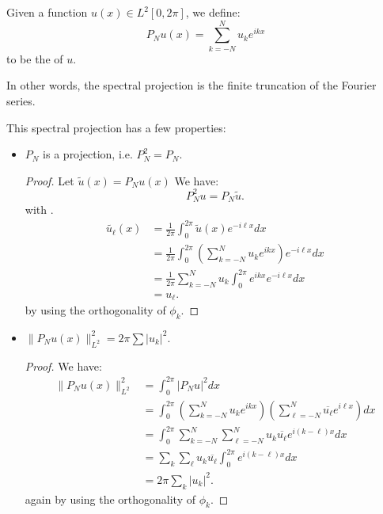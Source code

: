 \documentclass[../main/main.tex]{subfiles}
\begin{document}
    \begin{definition}
        Given a function $u(x) \in  L^2[0,2\pi]$, we define: \[
            P_Nu(x) = \sum_{k=-N}^N u_k e^{ikx}
        \] to be the  of $u$.  
    \end{definition}
    \begin{remark}
        In other words, the spectral projection is the finite truncation of the Fourier series.
    \end{remark}
    This spectral projection has a few properties:
    \begin{itemize}
        \item $P_N$ is a projection, i.e.  $P_N^2 = P_N$.
            \begin{proof}
                Let $\tilde{u}(x) = P_Nu(x)$
                We have: \[
                P_N^2 u = P_N \tilde{u}
                .\] with 
                .
                \begin{align*}
                    \tilde{u_\ell}(x) &= \frac{1}{2\pi} \int ^{2\pi}_0 \tilde{u}(x) e^{-i\ell x}dx \\
                                      &= \frac{1}{2\pi} \int ^{2\pi}_0 \left( \sum_{k = -N}^{N}u_k e^{ikx} \right)  e^{-i\ell x}dx \\
                                      &= \frac{1}{2\pi}\sum_{k=-N}^Nu_k \int ^{2\pi}_0 e^{ikx}  e^{-i\ell x}dx \\
                                      &= u_\ell
                .\end{align*}
                by using the orthogonality of $\phi_k$.
            \end{proof}
        \item $\|P_N u(x) \|^2_{L^2} = 2\pi \sum |u_k|^2$.
            \begin{proof}
                We have: 
                \begin{align*}
                    \|P_N u(x)\|^2_{L^2} &= \int ^{2\pi}_0 |P_Nu|^2 dx \\
                                     &= \int ^{2\pi}_0 \left( \sum_{k=-N}^{N} u_k e^{ikx}\right)\left( \sum_{\ell=-N}^{N} \overline{u_\ell} e^{i\ell x}\right) dx \\
                                     &= \int ^{2\pi}_0 \sum_{k=-N}^{N}\sum_{\ell=-N}^{N} u_k \overline{u_\ell} e^{i(k-\ell)x}dx \\
                                     &= \sum_k\sum_\ell u_k \overline{u_\ell} \int ^{2\pi}_0 e^{i(k-\ell) x}dx \\
                                     &= 2\pi \sum_k |u_k|^2 
                .\end{align*} again by using the orthogonality of $\phi_k$.  
            \end{proof}
    \end{itemize}
\end{document}

